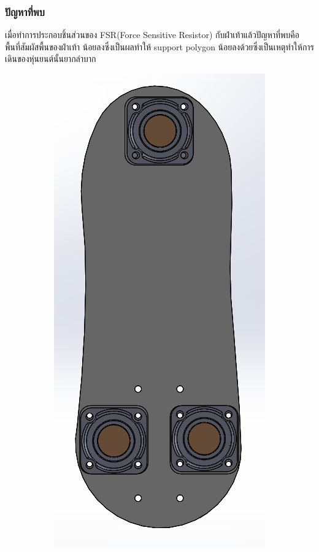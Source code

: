 \subsubsection*{ปัญหาที่พบ}
เมื่อทำการประกอบชิ้นส่วนของ FSR(Force Sensitive Resistor) กับฝ่าเท้าแล้วปัญหาที่พบคือ พื้นที่สัมผัสพื้นของฝ่าเท้า
น้อยลงซึ่งเป็นผลทำให้ support polygon น้อยลงด้วยซึ่งเป็นเหตุทำให้การเดินของหุ่นยนต์นั้นยากลำบาก
\begin{figure}[!ht]
  \centering
  \begin{subfigure}[b]{0.3\linewidth}
    \includegraphics[width=\linewidth]{chapter4/images/foot+FSR.PNG}

\end{subfigure}
\end{figure}
